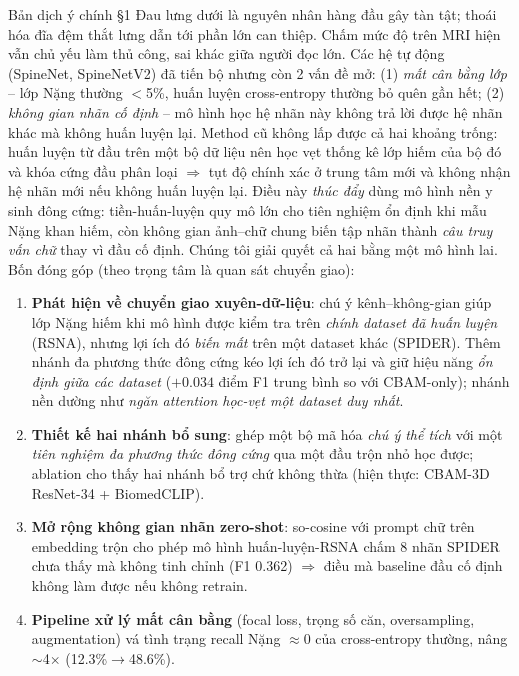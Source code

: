 \documentclass[12pt,a4paper]{article}
\begin{document}
\begin{dichbox}{Bản dịch ý chính §1}
Đau lưng dưới là nguyên nhân hàng đầu gây tàn tật; thoái hóa đĩa đệm thắt lưng dẫn tới phần lớn can thiệp. Chấm mức độ trên MRI hiện vẫn chủ yếu làm thủ công, sai khác giữa người đọc lớn. Các hệ tự động (SpineNet, SpineNetV2) đã tiến bộ nhưng còn 2 vấn đề mở: (1) \emph{mất cân bằng lớp} -- lớp Nặng thường $<$5\%, huấn luyện cross-entropy thường bỏ quên gần hết; (2) \emph{không gian nhãn cố định} -- mô hình học hệ nhãn này không trả lời được hệ nhãn khác mà không huấn luyện lại.
Method cũ không lấp được cả hai khoảng trống: huấn luyện từ đầu trên một bộ dữ liệu nên học vẹt thống kê lớp hiếm của bộ đó và khóa cứng đầu phân loại $\Rightarrow$ tụt độ chính xác ở trung tâm mới và không nhận hệ nhãn mới nếu không huấn luyện lại. Điều này \emph{thúc đẩy} dùng mô hình nền y sinh đông cứng: tiền-huấn-luyện quy mô lớn cho tiên nghiệm ổn định khi mẫu Nặng khan hiếm, còn không gian ảnh--chữ chung biến tập nhãn thành \emph{câu truy vấn chữ} thay vì đầu cố định. Chúng tôi giải quyết cả hai bằng một mô hình lai. Bốn đóng góp (theo trọng tâm là quan sát chuyển giao):
\begin{enumerate}[leftmargin=1.5em,itemsep=1pt]
\item \textbf{Phát hiện về chuyển giao xuyên-dữ-liệu}: chú ý kênh--không-gian giúp lớp Nặng hiếm khi mô hình được kiểm tra trên \emph{chính dataset đã huấn luyện} (RSNA), nhưng lợi ích đó \emph{biến mất} trên một dataset khác (SPIDER). Thêm nhánh đa phương thức đông cứng kéo lợi ích đó trở lại và giữ hiệu năng \emph{ổn định giữa các dataset} ($+0.034$ điểm F1 trung bình so với CBAM-only); nhánh nền dường như \emph{ngăn attention học-vẹt một dataset duy nhất}.
\item \textbf{Thiết kế hai nhánh bổ sung}: ghép một bộ mã hóa \emph{chú ý thể tích} với một \emph{tiên nghiệm đa phương thức đông cứng} qua một đầu trộn nhỏ học được; ablation cho thấy hai nhánh bổ trợ chứ không thừa (hiện thực: CBAM-3D ResNet-34 + BiomedCLIP).
\item \textbf{Mở rộng không gian nhãn zero-shot}: so-cosine với prompt chữ trên embedding trộn cho phép mô hình huấn-luyện-RSNA chấm 8 nhãn SPIDER chưa thấy mà không tinh chỉnh (F1 0.362) $\Rightarrow$ điều mà baseline đầu cố định không làm được nếu không retrain.
\item \textbf{Pipeline xử lý mất cân bằng} (focal loss, trọng số căn, oversampling, augmentation) vá tình trạng recall Nặng $\approx$0 của cross-entropy thường, nâng $\sim$4$\times$ (12.3\%$\to$48.6\%).
\end{enumerate}
\end{dichbox}
\end{document}
